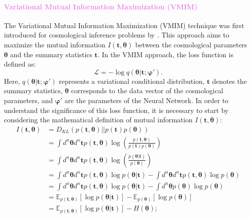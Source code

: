 \documentclass{aa}
\begin{document}
\paragraph{\textcolor{violet}{Variational Mutual Information Maximization (VMIM)}}
The Variational Mutual Information Maximization (VMIM) technique was first introduced for cosmological inference problems by \citet{jeffrey2021likelihood}. This approach aims to maximize the mutual information $I(\bm{t}, \bm {\theta})$ between the cosmological parameters $\bm{\theta}$ and the summary statistics $\bm{t}$.
In the VMIM approach, the loss function is defined as:
\begin{equation}\label{Eq:Loss_vmim}
    \mathcal{L}=- \log{q(\bm{\theta}|\bm{t};\bm{\varphi'})}.
\end{equation}
Here, $q(\bm{\theta}|\bm{t};\bm{\varphi'})$ represents a variational conditional distribution, $\bm{t}$ denotes the summary statistics, $\bm{\theta}$ corresponds to the data vector of the cosmological parameters, and $\bm{\varphi'}$ are the parameters of the Neural Network.
In order to understand the significance of this loss function, it is necessary to start by considering the mathematical definition of mutual information $I(\bm{t}, \bm {\theta})$:
\begin{align}\label{Eq:mutual_information}
    I(\bm{t}, \bm {\theta}) &= D_{KL}(p(\bm {t}, \bm {\theta})||p(\bm {t})p(\bm {\theta})) \\ \nonumber
    &= \int d^n \bm{\theta} d^n \bm{t} p(\bm t, \bm \theta)\log{\left( \frac{ p(\bm {t}, \bm {\theta})}{ p(\bm {t}) p(\bm {\theta})} \right)} \\ \nonumber
    &= \int d^n \bm{\theta} d^n \bm{t} p(\bm t, \bm {\theta})\log{\left( \frac{ p(\bm {\theta} | \bm {t} )}{ p(\bm {\theta})} \right)} \\ \nonumber
        &= \int d^n \bm{\theta} d^n \bm{t} p(\bm t, \bm {\theta})\log{p(\bm {\theta} | \bm {t} )} - \int d^n \bm{\theta}  d^n \bm{t} p(\bm t, \bm {\theta})\log{p(\bm {\theta})} \\ \nonumber
    &= \int d^n \bm{\theta} d^n \bm{t} p(\bm t, \bm {\theta})\log{p(\bm {\theta} | \bm {t} )} - \int d^n \bm{\theta} p(\bm {\theta})\log{p(\bm {\theta})} \\ \nonumber
    &= \mathbb{E}_{p(\bm {t}, \bm {\theta})} [\log{p(\bm {\theta} | \bm {t} )}]- \mathbb{E}_{p(\bm {\theta})} [\log{p(\bm {\theta})}] \\ \nonumber
    &= \mathbb{E}_{p(\bm {t}, \bm {\theta})} [\log{p(\bm {\theta} | \bm {t} )}]- H(\bm {\theta});
\end{align}
\end{document}

